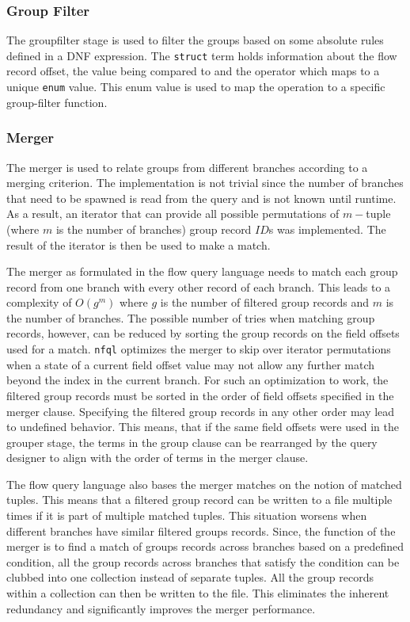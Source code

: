 \subsubsection{Group Filter} The groupfilter stage is used to filter the
groups based on some absolute rules defined in a \ac{DNF} expression. The
\texttt{struct} term holds information about the flow record offset, the value
being compared to and the operator which maps to a unique \texttt{enum} value.
This enum value is used to map the operation to a specific group-filter
function.

\subsubsection{Merger}

The merger is used to relate groups from different branches according to a
merging criterion. The implementation is not trivial since the number of
branches that need to be spawned is read from the query and is not known until
runtime. As a result, an iterator that can provide all possible permutations
of $m-$tuple (where $m$ is the number of branches) group record $ID$s was
implemented. The result of the iterator is then be used to make a match.

The merger as formulated in the flow query language needs to match each group
record from one branch with every other record of each branch. This leads to a
complexity of $O(g^m)$ where $g$ is the number of filtered group records and
$m$ is the number of branches. The possible number of tries when matching
group records, however, can be reduced by sorting the group records on the
field offsets used for a match. \texttt{nfql} optimizes the merger to skip
over iterator permutations when a state of a current field offset value may
not allow any further match beyond the index in the current branch.  For such
an optimization to work, the filtered group records must be sorted in the
order of field offsets specified in the merger clause.  Specifying the
filtered group records in any other order may lead to undefined behavior. This
means, that if the same field offsets were used in the grouper stage, the
terms in the group clause can be rearranged by the query designer to align
with the order of terms in the merger clause.

The flow query language also bases the merger matches on the notion of matched
tuples. This means that a filtered group record can be written to a file
multiple times if it is part of multiple matched tuples. This situation
worsens when different branches have similar filtered groups records. Since,
the function of the merger is to find a match of groups records across
branches based on a predefined condition, all the group records across
branches that satisfy the condition can be clubbed into one collection instead
of separate tuples. All the group records within a collection can then be
written to the file. This eliminates the inherent redundancy and significantly
improves the merger performance.

